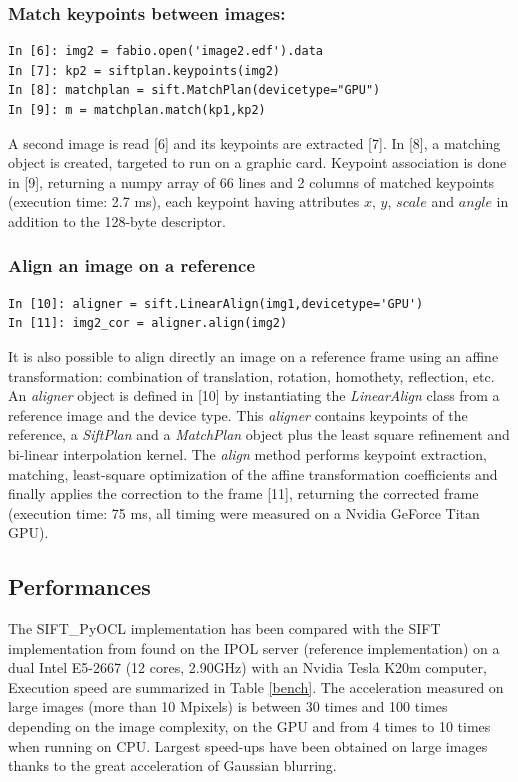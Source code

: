 \documentclass[preprint]{iucr}
\begin{document}
\subsubsection{Match keypoints between images:}
\begin{verbatim}
In [6]: img2 = fabio.open('image2.edf').data
In [7]: kp2 = siftplan.keypoints(img2)
In [8]: matchplan = sift.MatchPlan(devicetype="GPU")
In [9]: m = matchplan.match(kp1,kp2)
\end{verbatim}
A second image is read [6] and its keypoints are extracted [7].
In [8], a matching object is created, targeted to run on a graphic card.
Keypoint association is done in [9], returning a numpy array of 66 lines and 2
columns of matched keypoints (execution time: 2.7 ms), each keypoint having
attributes $x$, $y$, $scale$ and $angle$ in addition to the 128-byte descriptor.

\subsubsection{Align an image on a reference}
\begin{verbatim}
In [10]: aligner = sift.LinearAlign(img1,devicetype='GPU')
In [11]: img2_cor = aligner.align(img2)
\end{verbatim}
It is also possible to align directly an image on a reference frame using an
affine transformation: combination of translation, rotation, homothety,
reflection, etc.
An \emph{aligner} object is defined in [10] by instantiating the
\emph{LinearAlign} class from a reference image and the device type.
This \emph{aligner} contains keypoints of the
reference, a \emph{SiftPlan} and a \emph{MatchPlan} object plus the least square
refinement and bi-linear interpolation kernel.
The \emph{align} method performs keypoint extraction, matching, least-square
optimization of the affine transformation coefficients and finally applies the
correction to the frame [11], returning the corrected frame (execution time:
75 ms, all timing were measured on a Nvidia GeForce Titan GPU).

\subsection{Performances}

The SIFT\_PyOCL implementation has been compared with the SIFT
implementation from \cite{ASIFT} found on the IPOL server (reference
implementation) on a dual Intel E5-2667 (12 cores, 2.90GHz) with an Nvidia Tesla
K20m computer, Execution speed are summarized in Table \ref{bench}.
The acceleration measured on large images (more than 10 Mpixels) is between 30
times and 100 times depending on the image complexity, on the GPU and from 4
times to 10 times when running on CPU.
Largest speed-ups have been obtained on large images thanks to the
great acceleration of Gaussian blurring.
\end{document}
